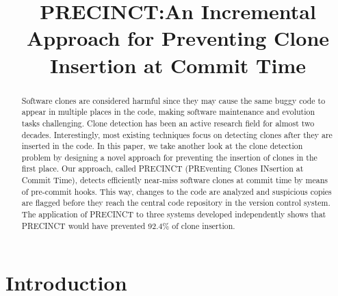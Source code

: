 \documentclass[conference]{IEEEtran}
\begin{document}
\title{PRECINCT:\@ An Incremental Approach for Preventing Clone Insertion at Commit Time}


\author{
\and
{}
}

\maketitle

\begin{abstract}
Software clones are considered harmful since they may cause the same buggy code to appear in multiple places in the code, making software maintenance and evolution tasks challenging. Clone detection has been an active research field for almost two decades.
Interestingly, most existing techniques focus on detecting clones after they are inserted in the code.
In this paper, we take another look at the clone detection problem by designing a novel approach for preventing the insertion of clones in the first place. Our approach, called PRECINCT (PREventing Clones INsertion at Commit Time),  detects efficiently  near-miss software clones at commit time by means of pre-commit hooks.
This way, changes to the code are analyzed and suspicious copies are flagged before they reach the central code repository in the version control system.  The application of PRECINCT to three systems developed independently shows that PRECINCT would have prevented 92.4\% of clone insertion.



\end{abstract}


\IEEEpeerreviewmaketitle

\section{Introduction}
\label{sec:Introduction}
\end{document}
